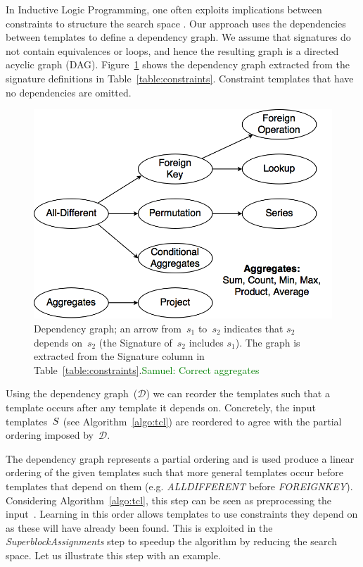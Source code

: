 \documentclass{IEEEtran}
\newcommand{\samuel}[1]{\textcolor{green}{{\sc Samuel:} #1}\xspace}
\newcommand{\format}[1]{\textit{#1}\xspace}
\newcommand{\generategroups}{\format{SuperblockAssignments}}
\newcommand{\CSignature}{Signature\xspace}
\newcommand{\dependencies}{\ensuremath{\mathcal{D}}\xspace}
\theoremstyle{definition}
\begin{document}
In Inductive Logic Programming, one often exploits implications between constraints to structure the search space \cite{luc_book}.
Our approach uses the dependencies between templates to define a dependency graph.
We assume that signatures do not contain equivalences or loops, and hence the resulting graph is a directed acyclic graph (DAG).
Figure~\ref{fig:learning_order} shows the dependency graph extracted from the signature definitions in Table~\ref{table:constraints}. 
Constraint templates that have no dependencies are omitted.

\begin{figure}[t]
  \centering
  \includegraphics[width=0.8\linewidth]{figures/constraint_dependency.png}
  \caption{Dependency graph; an arrow from~$s_1$ to~$s_2$ indicates that $s_2$ depends on~$s_2$ (the \CSignature of~$s_2$ includes $s_1$).
    The graph is extracted from the Signature column in Table~\ref{table:constraints}.\samuel{Correct aggregates}
  }
  \label{fig:learning_order}
\end{figure}

Using the dependency graph~(\dependencies) we can reorder the templates such that a template occurs after any template it depends on.
Concretely, the input templates~$S$ (see Algorithm~\ref{algo:tcl}) are reordered to agree with the partial ordering imposed by~\dependencies.

The dependency graph represents a partial ordering and is used produce a linear ordering of the given templates such that more general templates occur before templates that depend on them (e.g. \textit{ALLDIFFERENT} before \textit{FOREIGNKEY}).
Considering Algorithm~\ref{algo:tcl}, this step can be seen as preprocessing the input~\temps.
Learning in this order allows templates to use constraints they depend on as these will have already been found.
This is exploited in the \generategroups step to speedup the algorithm by reducing the search space.
Let us illustrate this step with an example.
\end{document}
